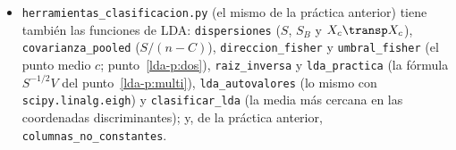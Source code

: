 \begin{itemize}[leftmargin=*,itemsep=2pt]
\raggedright
\item \texttt{herramientas\_clasificacion.py} (el mismo de la práctica
anterior) tiene también las funciones de LDA: \texttt{dispersiones} ($S$,
$S_B$ y $X_c\transp X_c$), \texttt{covarianza\_pooled} ($S/(n-C)$), \texttt{direccion\_fisher} y
\texttt{umbral\_fisher} (el punto medio $c$; punto~\ref{lda-p:dos}),
\texttt{raiz\_inversa} y \texttt{lda\_practica} (la fórmula $S^{-1/2}V$ del
punto~\ref{lda-p:multi}), \texttt{lda\_autovalores} (lo mismo con
\texttt{scipy.linalg.eigh}) y \texttt{clasificar\_lda} (la media más cercana
en las coordenadas discriminantes); y, de la práctica anterior,
\texttt{columnas\_no\_constantes}.
\end{itemize}

